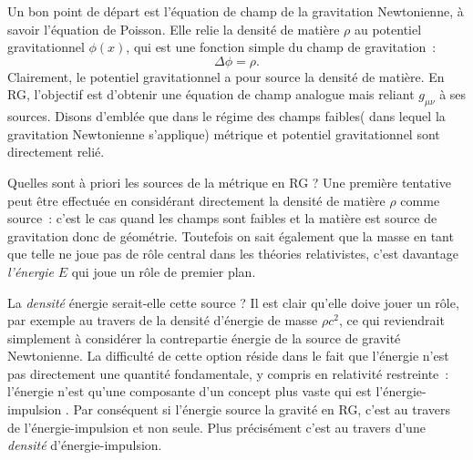 Un bon point de départ est l'équation de champ de la gravitation Newtonienne, à savoir l'équation de Poisson. Elle relie la densité de matière $\rho$ au potentiel gravitationnel $\phi(x)$, qui est une fonction simple du champ de gravitation~:
\begin{equation}
\Delta \phi =\rho.
\label{e:poisson}
\end{equation}
Clairement, le potentiel gravitationnel a pour source la densité de matière. En RG, l'objectif est d'obtenir une équation de champ analogue mais reliant $g_{\mu\nu}$ à ses sources. Disons d'emblée que dans le régime des champs faibles( dans lequel la gravitation Newtonienne s'applique) métrique et potentiel gravitationnel sont directement relié.

Quelles sont à priori les sources de la métrique en RG ? Une première tentative peut être effectuée en considérant directement la densité de matière $\rho$ comme source~: c'est le cas quand les champs sont faibles et la matière est source de gravitation donc de géométrie. Toutefois on sait également que la masse en tant que telle ne joue pas de rôle central dans les théories relativistes, c'est davantage \textit{l'énergie} $E$ qui joue un rôle de premier plan. 

La \textit{densité} énergie serait-elle cette source ? Il est clair qu'elle doive jouer un rôle, par exemple au travers de la densité d'énergie de masse $\rho c^2$, ce qui reviendrait simplement à considérer la contrepartie énergie de la source de gravité Newtonienne. La difficulté de cette option réside dans le fait que l'énergie n'est pas directement une quantité fondamentale, y compris en relativité restreinte~: l'énergie n'est qu'une composante d'un concept plus vaste qui est l'énergie-impulsion . Par conséquent si l'énergie source la gravité en RG, c'est au travers de l'énergie-impulsion et non seule. Plus précisément c'est au travers d'une \textit{densité} d'énergie-impulsion.

